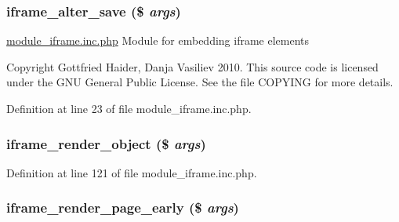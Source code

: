 \hypertarget{module__iframe_8inc_8php_a2db93d83522681e256287e019fe40abc}{
\subsubsection[{iframe\_\-alter\_\-save}]{\setlength{\rightskip}{0pt plus 5cm}iframe\_\-alter\_\-save (\$ {\em args})}}
\label{module__iframe_8inc_8php_a2db93d83522681e256287e019fe40abc}
\hyperlink{module__iframe_8inc_8php}{module\_\-iframe.inc.php} Module for embedding iframe elements

Copyright Gottfried Haider, Danja Vasiliev 2010. This source code is licensed under the GNU General Public License. See the file COPYING for more details. 

Definition at line 23 of file module\_\-iframe.inc.php.

\hypertarget{module__iframe_8inc_8php_a40856482f79fb837bc538e8eed66aff4}{
\subsubsection[{iframe\_\-render\_\-object}]{\setlength{\rightskip}{0pt plus 5cm}iframe\_\-render\_\-object (\$ {\em args})}}
\label{module__iframe_8inc_8php_a40856482f79fb837bc538e8eed66aff4}


Definition at line 121 of file module\_\-iframe.inc.php.

\hypertarget{module__iframe_8inc_8php_ad4d8fd8256a19beb570193c2886659e5}{
\subsubsection[{iframe\_\-render\_\-page\_\-early}]{\setlength{\rightskip}{0pt plus 5cm}iframe\_\-render\_\-page\_\-early (\$ {\em args})}}
\label{module__iframe_8inc_8php_ad4d8fd8256a19beb570193c2886659e5}


